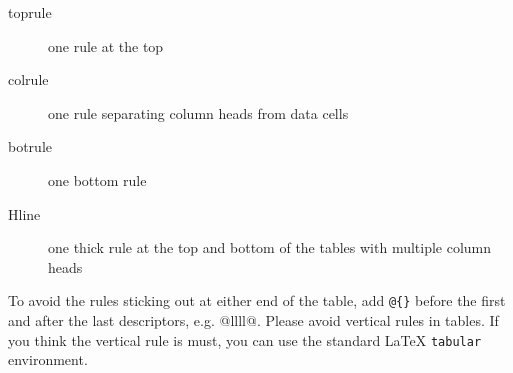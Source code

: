\begin{description}
\item[toprule] one rule at the top
\item[colrule] one rule separating column heads from data cells
\item[botrule] one bottom rule
\item[Hline] one thick rule at the top and bottom of the tables with multiple column heads
\end{description}

To avoid the rules sticking out at either end of the table, add
\verb|@{}| before the first and after the last descriptors, e.g.
{@{}llll@{}}. Please avoid vertical rules in tables. If you
think the vertical rule is must, you can use the standard \LaTeX{}
\verb|tabular| environment.

